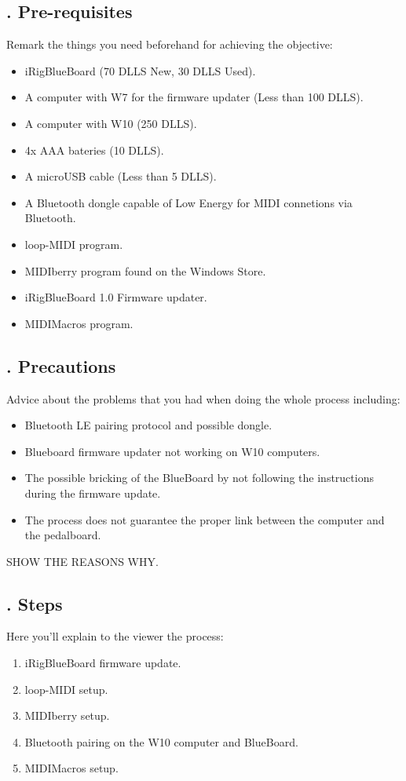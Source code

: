 \documentclass[letterpaper, 12pt]{article}
\begin{document}
\subsection*{{. Pre-requisites}} \justify
Remark the things you need beforehand for achieving the objective:
\begin{itemize}
    \item iRigBlueBoard (70 DLLS New, 30 DLLS Used).
    \item A computer with W7 for the firmware updater (Less than 100 DLLS).
    \item A computer with W10 (250 DLLS).
    \item 4x AAA bateries (10 DLLS).
    \item A microUSB cable (Less than 5 DLLS).
    \item A Bluetooth dongle capable of Low Energy for MIDI connetions via Bluetooth.
    \item loop-MIDI program.
    \item MIDIberry program found on the Windows Store.
    \item iRigBlueBoard 1.0 Firmware updater.
    \item MIDIMacros program.
\end{itemize}
\subsection*{{. Precautions}} \justify
Advice about the problems that you had when doing the whole process including:
\begin{itemize}
    \item Bluetooth LE pairing protocol and possible dongle.
    \item Blueboard firmware updater not working on W10 computers.
    \item The possible bricking of the BlueBoard by not following the instructions during the firmware update.
    \item The process does not guarantee the proper link between the computer and the pedalboard.
\end{itemize}
SHOW THE REASONS WHY.
\subsection*{{. Steps}} \justify
Here you'll explain to the viewer the process:
\begin{enumerate}
    \item iRigBlueBoard firmware update.
    \item loop-MIDI setup.
    \item MIDIberry setup.
    \item Bluetooth pairing on the W10 computer and BlueBoard.
    \item MIDIMacros setup.
\end{enumerate}
\end{document}
